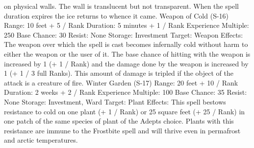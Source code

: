 \documentclass[a4paper]{article}
\begin{document}
\begin{multicols}{3}
on physical walls. The wall is translucent but not
transparent. When the spell duration expires the ice
returns to whence it came.
Weapon of Cold (S-16)
Range: 10 feet + 5 / Rank
Duration: 5 minutes + 1 / Rank
Experience Multiple: 250
Base Chance: 30%
Resist: None
Storage: Investment
Target: Weapon
Effects: The weapon over which the spell is cast
becomes infernally cold without harm to either the
weapon or the user of it. The base chance of hitting
with the weapon is increased by 1 (+ 1 / Rank) and
the damage done by the weapon is increased by 1
(+ 1 / 3 full Ranks). This amount of damage is
tripled if the object of the attack is a creature of
fire.
Winter Garden (S-17)
Range: 20 feet + 10 / Rank
Duration: 2 weeks + 2 / Rank
Experience Multiple: 100
Base Chance: 35%
Resist: None
Storage: Investment, Ward
Target: Plant
Effects: This spell bestows resistance to cold on
one plant (+ 1 / Rank) or 25 square feet (+ 25 /
Rank) in one patch of the same species of plant of
the Adepts choice. Plants with this resistance are
immune to the Frostbite spell and will thrive even
in permafrost and arctic temperatures.


\end{multicols}
\end{document}
